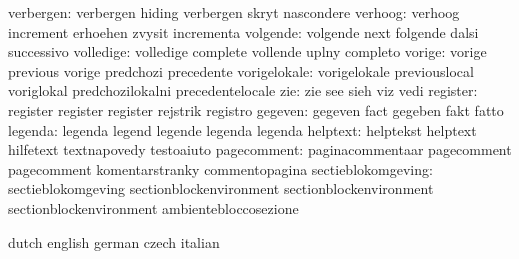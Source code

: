                verbergen: verbergen                 hiding
                           verbergen                 skryt
                           nascondere
                  verhoog: verhoog                   increment
                           erhoehen                  zvysit
                           incrementa
                 volgende: volgende                  next
                           folgende                  dalsi
                           successivo
                volledige: volledige                 complete
                           vollende                  uplny
                           completo
                   vorige: vorige                    previous
                           vorige                    predchozi
                           precedente
             vorigelokale: vorigelokale              previouslocal
                           voriglokal                predchozilokalni
                           precedentelocale
                      zie: zie                       see
                           sieh                      viz
                           vedi
                 register: register                  register
                           register                  rejstrik
                           registro
                  gegeven: gegeven                   fact
                           gegeben                   fakt
                           fatto
                  legenda: legenda                   legend
                           legende                   legenda
                           legenda
                 helptext: helptekst                 helptext
                           hilfetext                 textnapovedy
                           testoaiuto
              pagecomment: paginacommentaar          pagecomment
                           pagecomment               komentarstranky
                           commentopagina            %
       sectieblokomgeving: sectieblokomgeving        sectionblockenvironment
                           sectionblockenvironment   sectionblockenvironment
                           ambientebloccosezione     %

\stopelements




\startvariables            dutch                     english
                           german                    czech
                           italian

